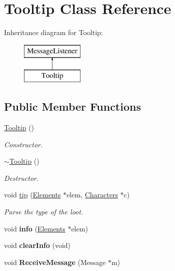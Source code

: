 \hypertarget{class_tooltip}{\section{Tooltip Class Reference}
\label{class_tooltip}
}
Inheritance diagram for Tooltip\+:\begin{figure}[H]
\begin{center}
\leavevmode
\includegraphics[height=2.000000cm]{class_tooltip}
\end{center}
\end{figure}
\subsection*{Public Member Functions}
\begin{DoxyCompactItemize}
\item 
\hyperlink{class_tooltip_a46a4bafd52456186b1fc7f48a554f8ef}{Tooltip} ()
\begin{DoxyCompactList}\small\item\em Constructor. \end{DoxyCompactList}\item 
\hyperlink{class_tooltip_aa06506a2c50e1edb1bd381e9613e481a}{$\sim$\+Tooltip} ()
\begin{DoxyCompactList}\small\item\em Destructor. \end{DoxyCompactList}\item 
void \hyperlink{class_tooltip_aa3120899b860a1a45ed3125d9dc4bfff}{tip} (\hyperlink{class_elements}{Elements} $\ast$elem, \hyperlink{class_characters}{Characters} $\ast$c)
\begin{DoxyCompactList}\small\item\em Parse the type of the loot. \end{DoxyCompactList}\item 
\hypertarget{class_tooltip_a0b888f38c2c4f7ebad6e14ad2266b928}{void {\bfseries info} (\hyperlink{class_elements}{Elements} $\ast$elem)}\label{class_tooltip_a0b888f38c2c4f7ebad6e14ad2266b928}

\item 
\hypertarget{class_tooltip_a8fc98561235b0f75104de4b2c8617096}{void {\bfseries clear\+Info} (void)}\label{class_tooltip_a8fc98561235b0f75104de4b2c8617096}

\item 
\hypertarget{class_tooltip_a6a2c12157977f0456deadc6a6591639e}{void {\bfseries Receive\+Message} (Message $\ast$m)}\label{class_tooltip_a6a2c12157977f0456deadc6a6591639e}

\end{DoxyCompactItemize}


